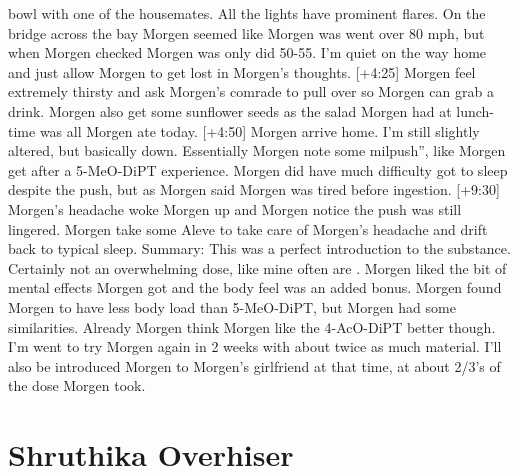 \documentclass[12pt]{book}
\begin{document}
bowl with one of the housemates. All the lights have prominent flares. On the bridge across the bay Morgen seemed like Morgen was went over 80 mph, but when Morgen checked Morgen was only did 50-55. I'm quiet on the way home and just allow Morgen to get lost in Morgen's thoughts. [+4:25] Morgen feel extremely thirsty and ask Morgen's comrade to pull over so Morgen can grab a drink. Morgen also get some sunflower seeds as the salad Morgen had at lunch-time was all Morgen ate today. [+4:50] Morgen arrive home. I'm still slightly altered, but basically down. Essentially Morgen note some milpush'', like Morgen get after a 5-MeO-DiPT experience. Morgen did have much difficulty got to sleep despite the push, but as Morgen said Morgen was tired before ingestion. [+9:30] Morgen's headache woke Morgen up and Morgen notice the push was still lingered. Morgen take some Aleve to take care of Morgen's headache and drift back to typical sleep. Summary: This was a perfect introduction to the substance. Certainly not an overwhelming dose, like mine often are . Morgen liked the bit of mental effects Morgen got and the body feel was an added bonus. Morgen found Morgen to have less body load than 5-MeO-DiPT, but Morgen had some similarities. Already Morgen think Morgen like the 4-AcO-DiPT better though. I'm went to try Morgen again in 2 weeks with about twice as much material. I'll also be introduced Morgen to Morgen's girlfriend at that time, at about 2/3's of the dose Morgen took.



\chapter{Shruthika Overhiser}
\end{document}
